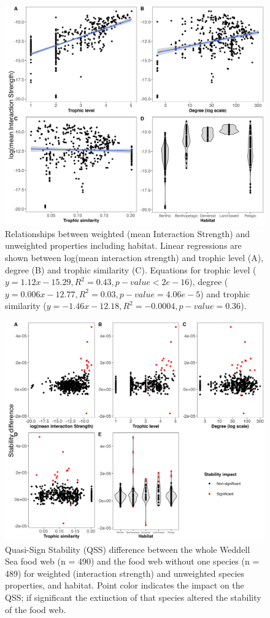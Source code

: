 \documentclass[gc, manuscript]{copernicus}
\begin{document}
\begin{figure}
\includegraphics[width=12cm]{Fig4_LinReg} \caption{Relationships between weighted (mean Interaction Strength) and unweighted properties including habitat. Linear regressions are shown between log(mean interaction strength) and trophic level (A), degree (B) and trophic similarity (C). Equations for trophic level ($y = 1.12x - 15.29, R^2 = 0.43, p-value < 2e-16$), degree ($y = 0.006x - 12.77, R^2 = 0.03, p-value = 4.06e-5$) and trophic similarity ($y = -1.46x - 12.18, R^2 = -0.0004, p-value = 0.36$).}\label{fig:unnamed-chunk-4}
\end{figure}

\clearpage

\begin{figure}
\includegraphics[width=12cm]{Fig.5_QSSDif} \caption{Quasi-Sign Stability (QSS) difference between the whole Weddell Sea food web (n = 490) and the food web without one species (n = 489) for weighted (interaction strength) and unweighted species properties, and habitat. Point color indicates the impact on the QSS; if significant the extinction of that species altered the stability of the food web.}\label{fig:unnamed-chunk-5}
\end{figure}
\end{document}
